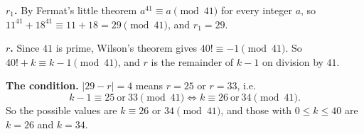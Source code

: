 \textbf{$r_1$.} By Fermat's little theorem $a^{41}\equiv a\pmod{41}$ for every integer $a$, so $11^{41}+18^{41}\equiv11+18=29\pmod{41}$, and $r_1=29$.

\textbf{$r$.} Since $41$ is prime, Wilson's theorem gives $40!\equiv-1\pmod{41}$. So $40!+k\equiv k-1\pmod{41}$, and $r$ is the remainder of $k-1$ on division by $41$.

\textbf{The condition.} $|29-r|=4$ means $r=25$ or $r=33$, i.e.
\[k-1\equiv25\ \text{or}\ 33\pmod{41}\iff k\equiv26\ \text{or}\ 34\pmod{41}.\]
So the possible values are $\boxed{k\equiv26\text{ or }34\pmod{41}}$, and those with $0\le k\le40$ are $k=26$ and $k=34$.
